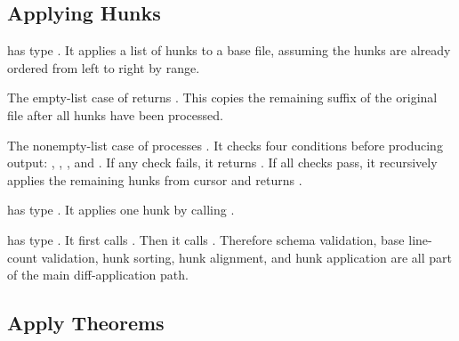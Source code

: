 \subsection{Applying Hunks}

\begin{definition}[applyOrderedHunks]
\code{[applyOrderedHunks]} has type
. It applies a
list of hunks to a base file, assuming the hunks are already ordered from left
to right by range.
\end{definition}

\begin{definition}
The empty-list case of \code{[applyOrderedHunks]} returns
. This copies the remaining suffix of the original
file after all hunks have been processed.
\end{definition}

\begin{definition}
The nonempty-list case of \code{[applyOrderedHunks]} processes
. It checks four conditions before producing output:
, ,
, and .
If any check fails, it returns . If all checks pass, it
recursively applies the remaining hunks from cursor  and
returns
.
\end{definition}

\begin{definition}[applyHunk]
\code{[applyHunk]} has type .
It applies one hunk by calling .
\end{definition}

\begin{definition}[applyDiff]
\code{[applyDiff]} has type .
It first calls . Then it calls
. Therefore schema validation,
base line-count validation, hunk sorting, hunk alignment, and hunk application
are all part of the main diff-application path.
\end{definition}

\subsection{Apply Theorems}

